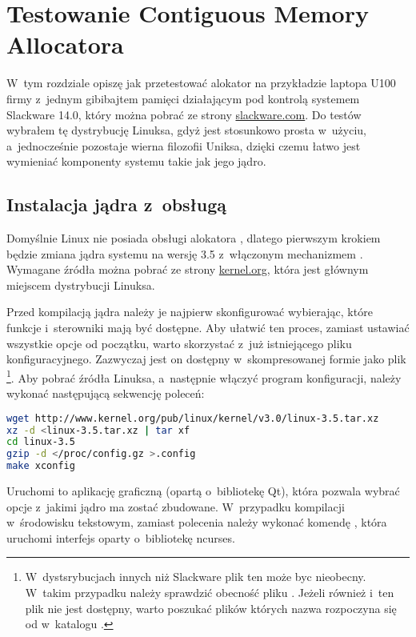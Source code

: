 \chapter{Testowanie Contiguous Memory Allocatora}

W~tym rozdziale opiszę jak przetestować alokator  na
przykładzie laptopa U100 firmy  z~jednym gibibajtem pamięci
 działającym pod kontrolą systemem Slackware 14.0, który
można pobrać ze strony \href{http://slackware.com/}{\ttfamily
  slackware.com}.  Do testów wybrałem tę dystrybucję Linuksa, gdyż
jest stosunkowo prosta w~użyciu, a~jednocześnie pozostaje wierna
filozofii Uniksa, dzięki czemu łatwo jest wymieniać komponenty systemu
takie jak jego jądro.


\section{Instalacja jądra z~obsługą }

Domyślnie Linux nie posiada obsługi alokatora , dlatego
pierwszym krokiem będzie zmiana jądra systemu na wersję 3.5
z~włączonym mechanizmem .  Wymagane źródła można pobrać ze
strony \href{http://kernel.org/}{\ttfamily kernel.org}, która jest
głównym miejscem dystrybucji Linuksa.

Przed kompilacją jądra należy je najpierw skonfigurować wybierając,
które funkcje i~sterowniki mają być dostępne.  Aby ułatwić ten proces,
zamiast ustawiać wszystkie opcje od początku, warto skorzystać z~już
istniejącego pliku konfiguracyjnego.  Zazwyczaj jest on dostępny
w~skompresowanej formie jako plik
\footnote{W~dystsrybucjach innych niż Slackware
  plik ten może byc nieobecny.  W~takim przypadku należy sprawdzić
  obecność pliku .  Jeżeli również i~ten plik nie
  jest dostępny, warto poszukać plików których nazwa rozpoczyna się od
   w~katalogu .}.  Aby pobrać źródła Linuksa,
a~następnie włączyć program konfiguracji, należy wykonać następującą
sekwencję poleceń:

\begin{lstlisting}[language=sh,numbers=none,columns=fullflexible]
wget http://www.kernel.org/pub/linux/kernel/v3.0/linux-3.5.tar.xz
xz -d <linux-3.5.tar.xz | tar xf
cd linux-3.5
gzip -d </proc/config.gz >.config
make xconfig
\end{lstlisting}

Uruchomi to aplikację graficzną (opartą o~bibliotekę Qt), która
pozwala wybrać opcje z~jakimi jądro ma zostać zbudowane.  W~przypadku
kompilacji w~środowisku tekstowym, zamiast polecenia
 należy wykonać komendę , która
uruchomi interfejs oparty o~bibliotekę ncurses.

